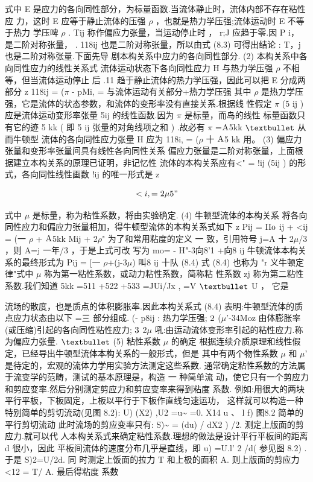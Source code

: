 式中 E 是应力的各向同性部分，为标量函数.当流体静止时，流体内部不存在粘性应 力，这时 E 应等于静止流体的压强 $\rho$ ，也就是热力学压强;流体运动时 E 不等于热力 学压啤 $\rho$ . Tij 称作偏应力张量，当运动停止时 ， r;J 应趋于零.因 P i， 是二阶对称张量， . 118ij 也是二阶对称张量，所以由式 (8.3) 可得出结论 : T，j 也是二阶对称张量.下面先导 剧本构关系中应力的各向同性部分. (2) 本构关系中各向同性应力的线性关系式 流体运动状态下各向同性应力 H 与热力学压强 $\rho$ 不相等，但当流体运动停止 后 .11 趋于静止流体的热力学压强，因此可以把 E 分成两部分 z 118ij = ($\pi$ - pMi, = 与流体运动有关部分+热力学压强 其中 $\rho$ 是热力学压强，它是流体的状态参数，和流体的变形率没有直接关系.根据线 性假定 $\pi$ (5 ij ) 应是流体运动变形率张量 5ij 的线性函数.因为 $\pi$ 是标量，而岛的线性 标量函数只有它的迹 5 kk ( 即 5 ij 张量的对角线项之和 ) .故必有 $\pi$ =${\rm A}$5kk ${\rm •}$ 从而牛顿型 流体的各向同性应力张量 H 应为 118i, = ($\rho$ 十 ${\rm A}$5 kk 用。 (3) 偏应力张量和变形率张量间具有线性各向同性关系 偏应力张量是二阶对称张量，上面根据建立本构关系的原理已证明，非记忆性 流体的本构关系应有<" = !ij (5ij ) 的形式，各向同性线性画数 !ij 的唯一形式是 z

\[<i, = 2\mu 5"\]

式中 $\mu$ 是标量，称为粘性系数，将由实验确定. (4) 牛顿型流体的本构关系 将各向同性应力和偏应力张量相加，得牛顿型流体的本构关系式如下 z Pij = II${\rm o}$ ij + <ij = (一 $\rho$ + ${\rm A}$5kk Mij + 2$\rho$" 为了和常用粘度的定义 一 致，引用符号 j=A 十 2$\mu$/3 ，则 A=j 一年/3 ，于是上式可改 写为 mo= - H"-3向8'1 +向8 ij 牛顿流体本构关系的最终形式为 Pij = [一 $\rho$+(j-3$\mu$) 叫8 ij 十队 (8.4) 式 (8.4) 也称为 "r 义牛顿定律"式中 $\mu$ 称为第一粘性系数，或动力粘性系数，简称粘 性系数 zj 称为第二粘性系数.我们知道 5kk =511 +522 +533 =JUi/Jx , =V ${\rm •}$ U ， 它是

流场的散度，也是质点的体积膨胀率.因此本构关系式 (8.4) 表明:牛顿型流体的质 点应力状态由以下 =三 部分组成. (- p8ij : 热力学压强; ${\rm 2}$ ($\mu$'-34Moz 由体膨胀率(或压缩)引起的各向同性粘性应力; ${\rm 3}$ 2$\mu$ 吼:由运动流体变形率引起的粘性应力.称为偏应力张量. ${\rm •}$ (5) 粘性系数 $\mu$ 的确定 根据连续介质原理和线性假定，已经导出牛顿型流体本构关系的一般形式，但是 其中有两个物性系数 $\mu$ 和 $\mu$' 是待定的，宏观的流体力学用实验方法测定这些系数. 通常确定粘性系数的方法属于流变学的范畴，测试的基本原理是，构造 一 种简单流 动，使它只有一个剪应力和剪应变率.然后分别测定剪应力和剪应变率来得到粘度 系数. 例如:用很大的两块平行平板，下板固定，上板以平行于下板作直线匀速运功， 这样就可以构造一种特别简单的剪切流动(见图 8.2): U) (X2) ,U2 =u\textasciitilde{} =0. X14 u 、 l f) 图8.2 简单的平行剪切流动 此时流场的剪应变率只有: S)\textasciitilde{} = (du) / dX2 ) /2. 测定上版面的剪应力.就可以代 人本构关系式来确定粘性系数.理想的做法是设计平行平板间的距离 d 很小，因此 平板间流体的速度分布几乎是直线，即 u) =U.l' 2 /d( 参见图 8.2) .于是 S)2=U/2d. 同 时测定上饭面的拉力 T 和上极的面积 A. 则上版面的剪应力 <12 = T/ A. 最后得粘度 系数

